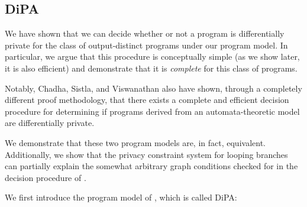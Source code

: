 \subsection{DiPA}

We have shown that we can decide whether or not a program is differentially private for the class of output-distinct programs under our program model. In particular, we argue that this procedure is conceptually simple (as we show later, it is also efficient) and demonstrate that it is \textit{complete} for this class of programs.

Notably, Chadha, Sistla, and Viswanathan \cite{chadhaLinearTimeDecidability2021} also have shown, through a completely different proof methodology, that there exists a complete and efficient decision procedure for determining if programs derived from an automata-theoretic model are differentially private. 

We demonstrate that these two program models are, in fact, equivalent. Additionally, we show that the privacy constraint system for looping branches can partially explain the somewhat arbitrary  graph conditions checked for in the decision procedure of \cite{chadhaLinearTimeDecidability2021}.

We first introduce the program model of \cite{chadhaLinearTimeDecidability2021}, which is called DiPA:

